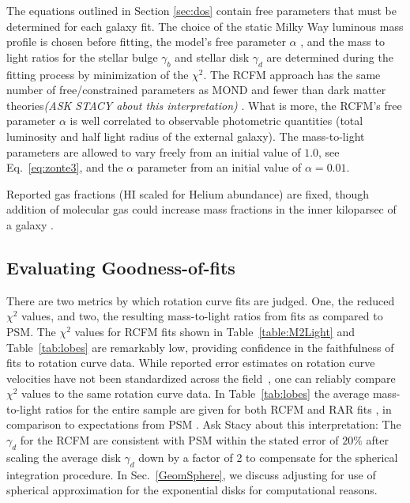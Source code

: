 \documentclass[reprint,%
 amsmath,amssymb,
 aps,
]{revtex4-1}
\begin{document}
The equations outlined in Section \ref{sec:dos} contain   free parameters that must be determined for each galaxy fit. The choice of the static Milky Way luminous mass profile is chosen before fitting,  the model's free parameter $\alpha$ ,  and the mass to light ratios for the  stellar bulge $\gamma_b$ and stellar disk $\gamma_d$ are determined during the fitting process by minimization of the $\chi^2$. 
The RCFM approach  has  the same number of free/constrained parameters as MOND and fewer than dark matter theories{\color{blue}\emph{(ASK STACY about this interpretation)} }.   What is more, the RCFM's free parameter $\alpha$ is well correlated to  observable photometric quantities (total luminosity and half light radius of the external galaxy).  
The mass-to-light parameters   are allowed to vary freely from an initial value of $1.0$, see Eq.~\ref{eq:zonte3}, and the $\alpha$ parameter     from an initial value of $\alpha = 0.01$. 

Reported gas fractions (HI scaled for Helium abundance) are fixed,  though addition of molecular gas could increase mass fractions in the inner kiloparsec of a galaxy   \cite{2004ApJ...609..652M}.





\subsection{Evaluating Goodness-of-fits}

There are two metrics by which rotation curve fits are judged. One, the reduced  $\chi^2$ values, and 
 two, the resulting mass-to-light ratios from   fits as compared to   PSM. 
The $\chi^{2}$ values for RCFM fits shown in Table~\ref{table:M2Light} and Table~\ref{tab:lobes} are remarkably low, providing confidence in the faithfulness of fits to rotation curve data.  
  While reported error    estimates on rotation curve velocities  have not been standardized across the field~\citep{Blok,Gent},     one can reliably   compare $\chi^{2}$ values  to the same rotation curve data. 
 In Table~\ref{tab:lobes}  the    average mass-to-light ratios for the entire sample are given for both RCFM and RAR fits ,  in comparison to expectations from PSM \citet{McGaugh2016RAR}.    {\color{teal} Ask Stacy about this interpretation: The $\gamma_d$ for the RCFM   are consistent with PSM within the stated error of $ 20\%$ \cite{2016Lelli} after scaling the average disk $\gamma_d$ down by a factor of 2 to compensate for the spherical integration procedure.   In Sec.~\ref{GeomSphere}, we discuss adjusting for use of  spherical approximation for the exponential disks for computational reasons.  }
  
\end{document}
